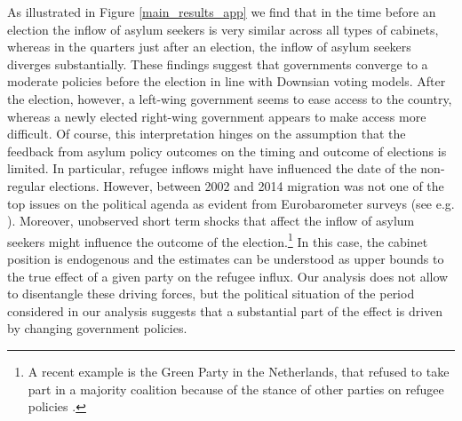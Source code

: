 \documentclass[a4paper,12pt]{article}
\begin{document}
As illustrated in Figure \ref{main_results_app} we find that in the time before an election the inflow of asylum seekers is very similar across all types of cabinets, whereas in the quarters just after an election, the inflow of asylum seekers diverges substantially. These findings suggest that governments converge to a moderate policies before the election in line with Downsian voting models. After the election, however, a left-wing government seems to ease access to the country, whereas a newly elected right-wing government appears to make access more difficult. Of course, this interpretation hinges on the assumption that the feedback from asylum policy outcomes on the timing and outcome of elections is limited. In particular, refugee inflows might have influenced the date of the non-regular elections. However, between 2002 and 2014 migration was not one of the top issues on the political agenda as evident from Eurobarometer surveys (see e.g. \citet{hatton2017}). Moreover, unobserved short term shocks that affect the inflow of asylum seekers might influence the outcome of the election.\footnote{A recent example is the Green Party in the Netherlands, that refused to take part in a majority coalition because of the stance of other parties on refugee policies \textit{\citep{Economist2017}}.} In this case, the cabinet position is endogenous and the estimates can be understood as upper bounds to the true effect of a given party on the refugee influx. Our analysis does not allow to disentangle these driving forces, but the political situation of the period considered in our analysis suggests that a substantial part of the effect is driven by changing government policies.


\end{document}
